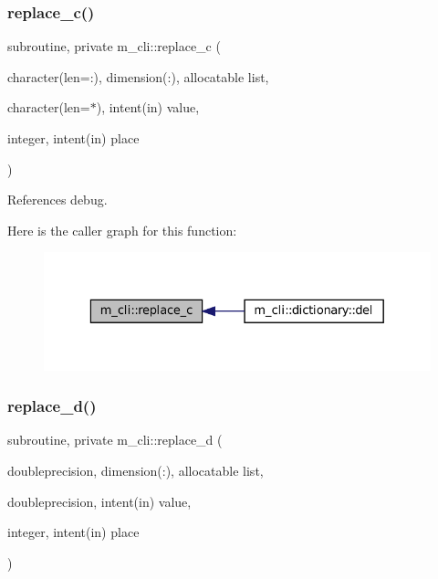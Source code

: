 \subsubsection{\texorpdfstring{replace\+\_\+c()}{replace\_c()}}
{\footnotesize\ttfamily subroutine, private m\+\_\+cli\+::replace\+\_\+c (\begin{DoxyParamCaption}\item[{character(len=\+:), dimension(\+:), allocatable}]{list,  }\item[{character(len=$\ast$), intent(in)}]{value,  }\item[{integer, intent(in)}]{place }\end{DoxyParamCaption})\hspace{0.3cm}{\ttfamily [private]}}



References debug.

Here is the caller graph for this function\+:
\nopagebreak
\begin{figure}[H]
\begin{center}
\leavevmode
\includegraphics[width=329pt]{namespacem__cli_a785aa0016768b6dc2e27c29d5342c329_icgraph}
\end{center}
\end{figure}
\mbox{\label{namespacem__cli_aa9b7d672cc9fb0bc79fd09a2870614f5}} 
\subsubsection{\texorpdfstring{replace\+\_\+d()}{replace\_d()}}
{\footnotesize\ttfamily subroutine, private m\+\_\+cli\+::replace\+\_\+d (\begin{DoxyParamCaption}\item[{doubleprecision, dimension(\+:), allocatable}]{list,  }\item[{doubleprecision, intent(in)}]{value,  }\item[{integer, intent(in)}]{place }\end{DoxyParamCaption})\hspace{0.3cm}{\ttfamily [private]}}




